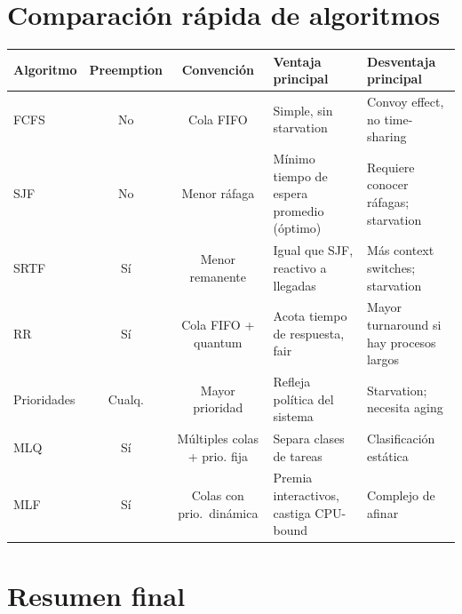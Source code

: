 \documentclass[11pt,a4paper]{article}
\begin{document}
\section{Comparación rápida de algoritmos}

\begin{center}
\small
\begin{tabular}{@{}lccp{3.5cm}p{3.8cm}@{}}
\toprule
Algoritmo & Preemption & Convención & Ventaja principal & Desventaja principal \\
\midrule
FCFS    & No  & Cola FIFO      & Simple, sin starvation & Convoy effect, no time-sharing \\
SJF     & No  & Menor ráfaga   & Mínimo tiempo de espera promedio (óptimo) & Requiere conocer ráfagas; starvation \\
SRTF    & Sí  & Menor remanente & Igual que SJF, reactivo a llegadas & Más context switches; starvation \\
RR      & Sí  & Cola FIFO + quantum & Acota tiempo de respuesta, fair & Mayor turnaround si hay procesos largos \\
Prioridades & Cualq. & Mayor prioridad & Refleja política del sistema & Starvation; necesita aging \\
MLQ     & Sí  & Múltiples colas + prio. fija & Separa clases de tareas & Clasificación estática \\
MLF     & Sí  & Colas con prio.\ dinámica & Premia interactivos, castiga CPU-bound & Complejo de afinar \\
\bottomrule
\end{tabular}
\end{center}

\section{Resumen final}
\end{document}
